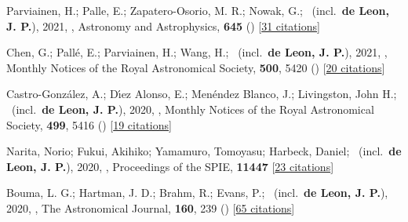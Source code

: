 \item[{\color{numcolor}\scriptsize33}] Parviainen, H.; Palle, E.; Zapatero-Osorio, M. R.; Nowak, G.; \etal\ (incl.\ \textbf{de Leon, J. P.}), 2021, , Astronomy and Astrophysics, \textbf{645} () [\href{https://ui.adsabs.harvard.edu/abs/2021A&A...645A..16P}{31 citations}]

\item[{\color{numcolor}\scriptsize32}] Chen, G.; Pall{\'e}, E.; Parviainen, H.; Wang, H.; \etal\ (incl.\ \textbf{de Leon, J. P.}), 2021, , Monthly Notices of the Royal Astronomical Society, \textbf{500}, 5420 () [\href{https://ui.adsabs.harvard.edu/abs/2021MNRAS.500.5420C}{20 citations}]

\item[{\color{numcolor}\scriptsize31}] Castro-Gonz{\'a}lez, A.; D{\'\i}ez Alonso, E.; Men{\'e}ndez Blanco, J.; Livingston, John H.; \etal\ (incl.\ \textbf{de Leon, J. P.}), 2020, , Monthly Notices of the Royal Astronomical Society, \textbf{499}, 5416 () [\href{https://ui.adsabs.harvard.edu/abs/2020MNRAS.499.5416C}{19 citations}]

\item[{\color{numcolor}\scriptsize30}] Narita, Norio; Fukui, Akihiko; Yamamuro, Tomoyasu; Harbeck, Daniel; \etal\ (incl.\ \textbf{de Leon, J. P.}), 2020, , Proceedings of the SPIE, \textbf{11447} [\href{https://www.spiedigitallibrary.org/conference-proceedings-of-spie/10925/1092507/Focus-adjustable-motion-blur-compensation-method-using-deformable-mirror/10.1117/12.2509567.short}{23 citations}]

\item[{\color{numcolor}\scriptsize29}] Bouma, L. G.; Hartman, J. D.; Brahm, R.; Evans, P.; \etal\ (incl.\ \textbf{de Leon, J. P.}), 2020, , The Astronomical Journal, \textbf{160}, 239 () [\href{https://ui.adsabs.harvard.edu/abs/2020AJ....160..239B}{65 citations}]

